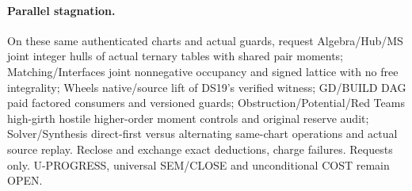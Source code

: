 \documentclass[11pt]{article}
\begin{document}
\paragraph{Parallel stagnation.}
On these same authenticated charts and actual guards, request Algebra/Hub/MS joint integer hulls of actual ternary tables with shared pair moments; Matching/Interfaces joint nonnegative occupancy and signed lattice with no free integrality; Wheels native/source lift of DS19's verified witness; GD/BUILD DAG paid factored consumers and versioned guards; Obstruction/Potential/Red Teams high-girth hostile higher-order moment controls and original reserve audit; Solver/Synthesis direct-first versus alternating same-chart operations and actual source replay. Reclose and exchange exact deductions, charge failures. Requests only. U-PROGRESS, universal SEM/CLOSE and unconditional COST remain OPEN.
\end{document}
